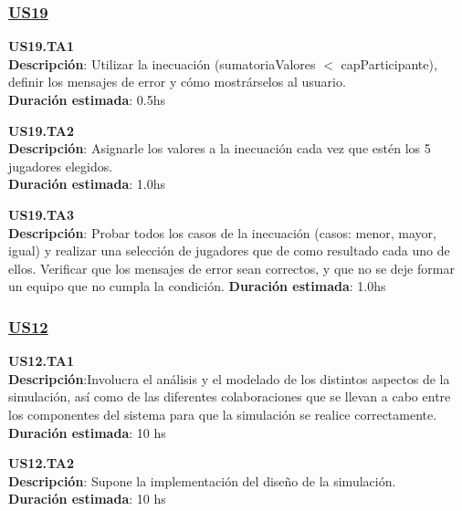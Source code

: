 \subsubsection*{\underline{US19}}

\begin{tcolorbox}
\textbf{US19.TA1} \\
\textbf{Descripción}: Utilizar la inecuación (sumatoriaValores $<$ capParticipante), definir los mensajes de error y cómo mostrárselos al usuario.\\ 
\textbf{Duración estimada}: 0.5hs
\end{tcolorbox}
\vspace{10pt}

\begin{tcolorbox}
\textbf{US19.TA2} \\
\textbf{Descripción}: Asignarle los valores a la inecuación cada vez que estén los 5 jugadores elegidos. \\
\textbf{Duración estimada}: 1.0hs
\end{tcolorbox}
\vspace{10pt}

\begin{tcolorbox}
\textbf{US19.TA3} \\
\textbf{Descripción}: Probar todos los casos de la inecuación (casos: menor, mayor, igual) y realizar una selección de jugadores que de como resultado cada uno de ellos. Verificar que los mensajes de error sean correctos, y que no se deje formar un equipo que no cumpla la condición.
\textbf{Duración estimada}: 1.0hs
\end{tcolorbox}
\vspace{10pt}


\subsubsection*{\underline{US12}}

\begin{tcolorbox}
\textbf{US12.TA1} \\
\textbf{Descripción}:Involucra el análisis y el modelado de los distintos aspectos de la simulación, así como de las diferentes colaboraciones que se llevan a cabo entre los componentes del sistema para que la simulación se realice correctamente.\\
\textbf{Duración estimada}: 10 hs
\end{tcolorbox}
\vspace{10pt}

\begin{tcolorbox}
\textbf{US12.TA2} \\
\textbf{Descripción}: Supone la implementación del diseño de la simulación.\\
\textbf{Duración estimada}: 10 hs
\end{tcolorbox}
\vspace{10pt}

